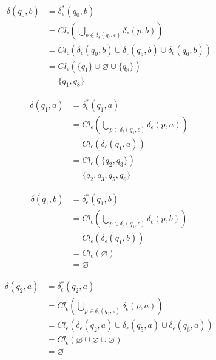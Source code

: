 \documentclass{article}
\begin{document}
\begin{enumerate}
{\begin{enumerate}
{					\begin{align*}
						\delta(q_{0}, b) &= \delta^{*}_{\epsilon}(q_{0}, b) \\
						&= Cl_{\epsilon}(\bigcup_{p \in \delta_{\epsilon}(q_{0}, \epsilon)}
						{\delta_{\epsilon}(p, b)}) \\
						&= Cl_{\epsilon}(\delta_{\epsilon}(q_{0}, b) 
						\cup \delta_{\epsilon}(q_{5}, b)
						\cup \delta_{\epsilon}(q_{6}, b))\\
						&= Cl_{\epsilon}(\{q_{1}\} \cup \varnothing \cup \{q_{8}\})\\
						&= \{q_{1}, q_{8}\}
					\end{align*}

					\begin{align*}
						\delta(q_{1}, a) &= \delta^{*}_{\epsilon}(q_{1}, a) \\
						&= Cl_{\epsilon}(\bigcup_{p \in \delta_{\epsilon}(q_{1}, \epsilon)}
						{\delta_{\epsilon}(p, a)}) \\
						&= Cl_{\epsilon}(\delta_{\epsilon}(q_{1}, a))\\
						&= Cl_{\epsilon}(\{q_{2}, q_{3}\})\\
						&= \{q_{2}, q_{3}, q_{5}, q_{6}\}
					\end{align*}

					\begin{align*}
						\delta(q_{1}, b) &= \delta^{*}_{\epsilon}(q_{1}, b) \\
						&= Cl_{\epsilon}(\bigcup_{p \in \delta_{\epsilon}(q_{1}, \epsilon)}
						{\delta_{\epsilon}(p, b)}) \\
						&= Cl_{\epsilon}(\delta_{\epsilon}(q_{1}, b)) \\
						&= Cl_{\epsilon}(\varnothing) \\
						&= \varnothing
					\end{align*}

					\begin{align*}
						\delta(q_{2}, a) &= \delta^{*}_{\epsilon}(q_{2}, a) \\
						&= Cl_{\epsilon}(\bigcup_{p \in \delta_{\epsilon}(q_{2}, \epsilon)}
						{\delta_{\epsilon}(p, a)}) \\
						&= Cl_{\epsilon}(\delta_{\epsilon}(q_{2}, a) 
						\cup \delta_{\epsilon}(q_{5}, a)
						\cup \delta_{\epsilon}(q_{6}, a))\\
						&= Cl_{\epsilon}(\varnothing \cup \varnothing \cup \varnothing)\\
						&= \varnothing
					\end{align*}

}
\end{enumerate}}
\end{enumerate}
\end{document}

